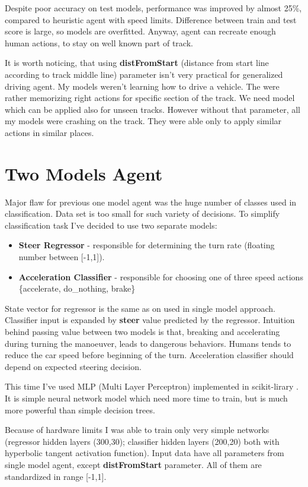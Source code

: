 \documentclass[declaration,shortabstract,english,inz]{iithesis}
\begin{document}
Despite poor accuracy on test models, performance was improved by almost 25\%, compared to heuristic agent with speed limits.
Difference between train and test score is large, so models are overfitted.
Anyway, agent can recreate enough human actions, to stay on well known part of track.


It is worth noticing, that using \textbf{distFromStart} (distance from start line according to track middle line) parameter isn't very practical for generalized driving agent.
My models weren't learning how to drive a vehicle.
The were rather memorizing right actions for specific section of the track.
We need model which can be applied also for unseen tracks.
However without that parameter, all my models were crashing on the track.
They were able only to apply similar actions in similar places.

\section{Two Models Agent}

Major flaw for previous one model agent was the huge number of classes used in classification.
Data set is too small for such variety of decisions.
To simplify classification task I've decided to use two separate models: 

\begin{itemize}
    \item \textbf{Steer Regressor} - responsible for determining the turn rate (floating number between [-1,1]).
    \item \textbf{Acceleration Classifier} - responsible for choosing one of three speed actions \{accelerate, do\_nothing, brake\}
\end{itemize}

State vector for regressor is the same as on used in single model approach.
Classifier input is expanded by \textbf{steer} value predicted by the regressor.
Intuition behind passing value between two models is that, breaking and accelerating during turning the manoeuver, leads to dangerous behaviors.
Humans tends to reduce the car speed before beginning of the turn.
Acceleration classifier should depend on expected steering decision.


This time I've used MLP (Multi Layer Perceptron) implemented in scikit-lirary \cite{scikit_learn}.
It is simple neural network model which need more time to train, but is much more powerful than simple decision trees.


Because of hardware limits I was able to train only very simple networks (regressor hidden layers (300,30); classifier hidden layers (200,20) both with hyperbolic tangent activation function).
Input data have all parameters from single model agent, except \textbf{distFromStart} parameter.
All of them are standardized in range [-1,1].
\end{document}
